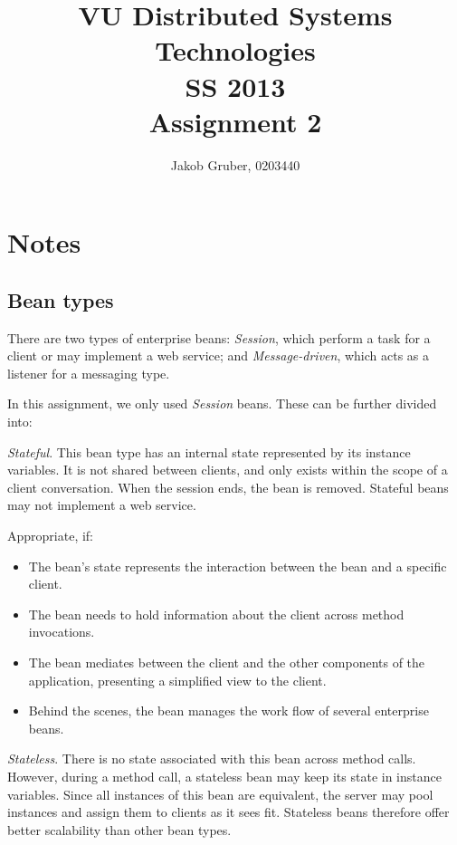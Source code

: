 \documentclass[a4paper,10pt]{article}
\title{VU Distributed Systems Technologies \\
       SS 2013 \\
       Assignment 2}
\author{Jakob Gruber, 0203440}
\begin{document}
\maketitle


\section{Notes}

\subsection{Bean types}

There are two types of enterprise beans: \emph{Session}, which perform a task for
a client or may implement a web service; and \emph{Message-driven}, which acts
as a listener for a messaging type.

In this assignment, we only used \emph{Session} beans. These can be further divided
into:

\emph{Stateful}. This bean type has an internal state represented by its instance variables.
It is not shared between clients, and only exists within the scope of a client
conversation. When the session ends, the bean is removed. Stateful beans may not implement
a web service.

Appropriate, if: 

\begin{itemize}
    \item The bean’s state represents the interaction between the bean and a specific client.
    \item The bean needs to hold information about the client across method invocations.
    \item The bean mediates between the client and the other components of the application, presenting a simplified view to the client.
    \item Behind the scenes, the bean manages the work flow of several enterprise beans.
\end{itemize}

\emph{Stateless}. There is no state associated with this bean across method calls. However,
during a method call, a stateless bean may keep its state in instance variables.
Since all instances of this bean are equivalent, the server may pool instances and
assign them to clients as it sees fit. Stateless beans therefore offer better scalability
than other bean types. 
\end{document}
